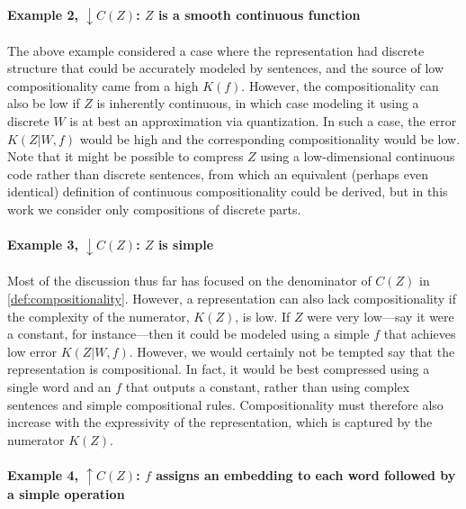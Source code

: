 \documentclass{article} %
\begin{document}
\begin{appendices}
\paragraph{Example 2, $\downarrow C(Z)$: $Z$ is a smooth continuous function}

The above example considered a case where the representation had discrete structure that could be accurately modeled by sentences, and the source of low compositionality came from a high $K(f)$. However, the compositionality can also be low if $Z$ is inherently continuous, in which case modeling it using a discrete $W$ is at best an approximation via quantization. In such a case, the error $K(Z|W,f)$ would be high and the corresponding compositionality would be low. Note that it might be possible to compress $Z$ using a low-dimensional continuous code rather than discrete sentences, from which an equivalent (perhaps even identical) definition of continuous compositionality could be derived, but in this work we consider only compositions of discrete parts.

\paragraph{Example 3, $\downarrow C(Z)$: $Z$ is simple}

Most of the discussion thus far has focused on the denominator of $C(Z)$ in \cref{def:compositionality}. However, a representation can also lack compositionality if the complexity of the numerator, $K(Z)$, is low. If $Z$ were very low---say it were a constant, for instance---then it could be modeled using a simple $f$ that achieves low error $K(Z|W,f)$. However, we would certainly not be tempted say that the representation is compositional. In fact, it would be best compressed using a single word and an $f$ that outputs a constant, rather than using complex sentences and simple compositional rules. Compositionality must therefore also increase with the expressivity of the representation, which is captured by the numerator $K(Z)$.

\paragraph{Example 4, $\uparrow C(Z)$: $f$ assigns an embedding to each word followed by a simple operation}


\end{appendices}
\end{document}
